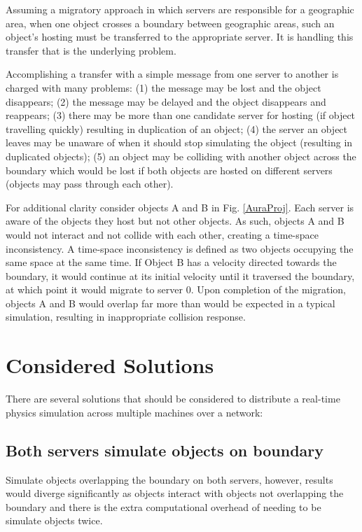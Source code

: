 Assuming a migratory approach in which servers are responsible for a geographic area, when one object crosses a boundary between geographic areas, such an object's hosting must be transferred to the appropriate server. It is handling this transfer that is the underlying problem.

Accomplishing a transfer with a simple message from one server to another is charged with many problems: (1) the message may be lost and the object disappears; (2) the message may be delayed and the object disappears and reappears; (3) there may be more than one candidate server for hosting (if object travelling quickly) resulting in duplication of an object; (4) the server an object leaves may be unaware of when it should stop simulating the object (resulting in duplicated objects)\cite{High-performanceServerSystems}; (5) an object may be colliding with another object across the boundary which would be lost if both objects are hosted on different servers (objects may pass through each other).

For additional clarity consider objects A and B in Fig. \ref{AuraProj}. Each server is aware of the objects they host but not other objects. As such, objects A and B would not interact and not collide with each other, creating a time-space inconsistency. A time-space inconsistency is defined as two objects occupying the same space at the same time. If Object B has a velocity directed towards the boundary, it would continue at its initial velocity until it traversed the boundary, at which point it would migrate to server 0. Upon completion of the migration, objects A and B would overlap far more than would be expected in a typical simulation, resulting in inappropriate collision response.

\section{Considered Solutions}\label{ConsideredSolutions}
There are several solutions that should be considered to distribute a real-time physics simulation across multiple machines over a network:

\subsection{Both servers simulate objects on boundary}
Simulate objects overlapping the boundary on both servers, however, results would diverge significantly as objects interact with objects not overlapping the boundary and there is the extra computational overhead of needing to be simulate objects twice.

